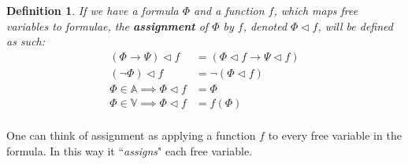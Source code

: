 \documentclass{article}
\newtheorem{defin}{Definition}
\begin{document}
\begin{defin}
If we have a formula $\Phi$ and a function $f$, which maps free variables to formulae,
the \textbf{assignment} of $\Phi$ by $f$, denoted $\Phi \lhd f$, will be defined as such:
\begin{align*}
(\Phi \rightarrow \Psi) \lhd f &= (\Phi \lhd f \rightarrow \Psi \lhd f) \\
(\neg \Phi) \lhd f &= \neg (\Phi \lhd f) \\
\Phi \in \mathbb{A} \implies \Phi \lhd f &= \Phi \\
\Phi \in \mathbb{V} \implies \Phi \lhd f &= f(\Phi) \\
\end{align*}
\end{defin}

One can think of assignment as applying a function $f$ to every free variable in the formula.
In this way it ``\textit{assigns}" each free variable.
\end{document}
